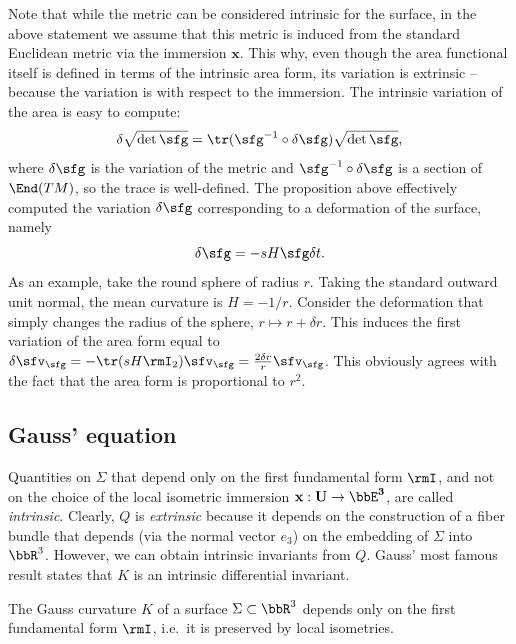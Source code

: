 \begin{rem}
    Note that while the metric can be considered intrinsic for the surface, in the above statement we assume that this metric is induced from the standard Euclidean metric via the immersion $\bm{x}$. This why, even though the area functional itself is defined in terms of the intrinsic area form, its variation is extrinsic -- because the variation is with respect to the immersion. The intrinsic variation of the area is easy to compute:
    \[\delta \sqrt{\det\sfg}=\tr (\sfg^{-1}\circ \delta \sfg)\sqrt{\det\sfg},\]
    where $\delta\sfg$ is the variation of the metric and $\sfg^{-1}\circ \delta \sfg$ is a section of $\End(TM)$, so the trace is well-defined. The proposition above effectively computed the variation $\delta\sfg$ corresponding to a deformation of the surface, namely 
    \[\delta\sfg=-sH\sfg\delta t.\]
    As an example, take the round sphere of radius $r$. Taking the standard outward unit normal, the mean curvature is $H=-1/r$. Consider the deformation that simply changes the radius of the sphere, $r\mapsto r+\delta r$. This induces the first variation of the area form equal to $\delta \sfv_{\sfg}=-\tr(sH \rmI_2)\sfv_{\sfg}=\frac{2\delta r}{r}\sfv_{\sfg}$. This obviously agrees with the fact that the area form is proportional to $r^2$.
\end{rem}




\subsection{Gauss' equation}


Quantities on $\Sigma$ that depend only on the first fundamental form $\rmI$, and not on the choice of the local isometric immersion $\bf{x}:U\to \bbE^3$, are called \emph{intrinsic}. Clearly, $Q$ is \emph{extrinsic} because it depends on the construction of a fiber bundle that depends (via the normal vector $e_3$) on the embedding of $\Sigma$ into $\bbR^3$. However, we can obtain intrinsic invariants from $Q$. Gauss' most famous result states that $K$ is an intrinsic differential invariant.

\begin{thm}\label{thm egregium}
    The Gauss curvature $K$ of a surface $\Sigma\subset\bbR^3$ depends only on the first fundamental form $\rmI$, i.e.\ it is preserved by local isometries.
\end{thm}

